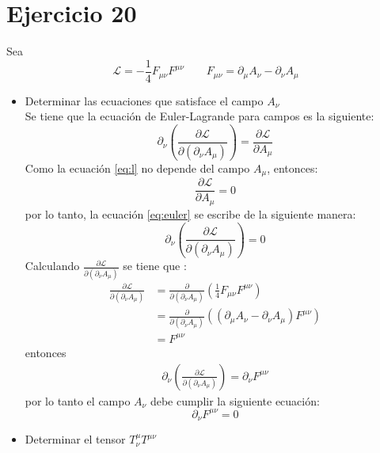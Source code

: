 \section*{Ejercicio 20}
Sea 
\begin{equation}\label{eq:l}
    \mathcal{L } = -\frac{1}{4}F_{\mu\nu}F^{\mu\nu} \qquad F_{\mu \nu}= \partial_\mu A_\nu - \partial_\nu A_\mu
\end{equation}
\begin{itemize}
    \item Determinar las ecuaciones que satisface el campo $A_\nu$\\
    Se tiene que la ecuación de Euler-Lagrande para campos es la siguiente:
\begin{equation}
  \partial_\nu \left( \frac{\partial \mathcal{L}}{\partial (\partial_\nu A_\mu)}\right) = \frac{\partial \mathcal{L}}{\partial A_\mu}
  \label{eq:euler}
\end{equation}
Como la ecuación \ref{eq:l} no depende del campo $A_\mu$, entonces:
\begin{equation*}
  \frac{\partial \mathcal{L}}{\partial A_\mu} = 0
\end{equation*}
por lo tanto, la ecuación \ref{eq:euler} se escribe de la siguiente manera:
\begin{equation}
  \partial_\nu \left( \frac{\partial \mathcal{L}}{\partial (\partial_\nu A_\mu)}\right) = 0
  \label{eq:euler2}
\end{equation}
Calculando $ \frac{\partial \mathcal{L}}{\partial (\partial_\nu A_\mu)}$ se tiene que :
  \begin{align*}
    \frac{\partial \mathcal{L}}{\partial (\partial_\nu A_\mu)} &=   \frac{\partial }{\partial (\partial_\nu A_\mu)} \left(\frac{1}{4}F_{\mu \nu} F^{\mu \nu} \right)\\
    &= \frac{\partial }{\partial (\partial_\nu A_\mu)}(\left(\partial_\mu A_\nu - \partial_\nu A_\mu\right) F^{\mu \nu})\\
    & = F^{\mu \nu }
  \end{align*}
  entonces
  \begin{align*}
      \partial_\nu \left( \frac{\partial \mathcal{L}}{\partial (\partial_\nu A_\mu)}\right)=
      \partial_\nu F^{\mu \nu} 
  \end{align*}
  por lo tanto el campo $A_\nu$ debe cumplir la siguiente ecuación:
  \begin{equation*}
    \partial_\nu F^{\mu \nu} =0
  \end{equation*} 
    \item Determinar el tensor $T^\mu_\nu T^{\mu\nu}$\\

\end{itemize}
